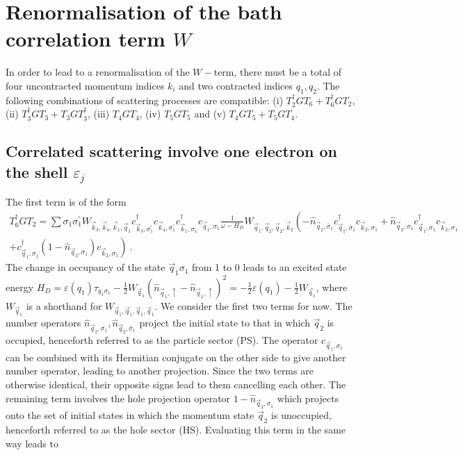 \documentclass{revtex4-2}
\begin{document}
\section{Renormalisation of the bath correlation term \(W\)}
In order to lead to a renormalisation of the \(W-\)term, there must be a total of four uncontracted momentum indices \(k_i\) and two contracted indices \(q_1, q_2\). The following combinations of scattering processes are compatible: (i) \(T_2^\dagger G T_6 + T_6^\dagger G T_2\), (ii) \(T_3^\dagger G T_3 + T_3 G T_3^\dagger\), (iii) \(T_4 G T_4\), (iv) \(T_5 G T_5\) and (v) \(T_4 G T_5 + T_5 G T_4\).

\subsection{Correlated scattering involve one electron on the shell \(\varepsilon_j\)}
The first term is of the form
\begin{equation}\begin{aligned}
	T_6^\dagger G T_2 = \sum \sigma_1\sigma_1^\prime W_{\vec k_3,\vec k_4,\vec k_1,\vec q_1} c^\dagger_{\vec k_3, \sigma_1^\prime}c_{\vec k_4,\sigma_1^\prime}c^\dagger_{\vec k_1,\sigma_1}c_{\vec q_1,\sigma_1} \frac{1}{\omega - H_D}W_{\vec q_1,\vec q_2,\vec q_2,\vec k_2} \left(-\hat n_{\vec q_2,\bar\sigma_1}c^\dagger_{\vec q_1,\sigma_1}c_{\vec k_2,\sigma_1} + \hat n_{\vec q_2,\sigma_1}c^\dagger_{\vec q_1,\sigma_1}c_{\vec k_2,\sigma_1} \right.\\
	\left.+ c^\dagger_{\vec q_1,\sigma_1}\left(1 - \hat n_{\vec q_2,\bar\sigma_1}\right) c_{\vec k_2,\sigma_1}\right)~.
\end{aligned}\end{equation}
The change in occupancy of the state \(\vec q_1\sigma_1\) from 1 to 0 leads to an excited state energy \(H_D = \varepsilon(q_1)\tau_{q_1\sigma_1} - \frac{1}{2}W_{\vec q_1}\left(\hat n_{\vec q_1, \uparrow} - \hat n_{\vec q_1, \uparrow}\right)^2 = -\frac{1}{2}\varepsilon(q_1) - \frac{1}{2}W_{\vec q_1}\), where \(W_{\vec q_1}\) is a shorthand for \(W_{\vec q_1,\vec q_1,\vec q_1,\vec q_1}\). We consider the first two terms for now. The number operators \(\hat n_{\vec q_2,\sigma_1}, \hat n_{\vec q_2,\bar\sigma_1}\) project the initial state to that in which \(\vec q_2\) is occupied, henceforth referred to as the particle sector (PS). The operator \(c_{\vec q_1,\sigma_1}\) can be combined with its Hermitian conjugate on the other side to give another number operator, leading to another projection. Since the two terms are otherwise identical, their opposite signs lead to them cancelling each other. The remaining term involves the hole projection operator \(1 - \hat n_{\vec q_2,\sigma_1}\) which projects onto the set of initial states in which the momentum state \(\vec q_2\) is unoccupied, henceforth referred to as the hole sector (HS). Evaluating this term in the same way leads to
\end{document}
